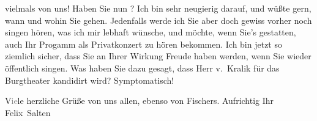 \begin{ledgroupsized}[t]{13cm}
               vielmals von uns! Haben Sie
               nun \label{K_L03560-5v}\label{K_L03560-5h}? Ich bin sehr neugierig darauf, und wüßte gern,
               wann und wohin Sie gehen. Jedenfalls werde ich Sie aber doch gewiss vorher noch
               singen hören, was ich mir lebhaft wünsche, und möchte, wenn Sie’s gestatten, auch Ihr
               Progamm als Privatkonzert zu hören bekommen. Ich bin jetzt so ziemlich sicher, dass
               Sie an Ihrer Wirkung Freude haben werden, wenn Sie wieder öffentlich singen.\pend
           \pstart
           Was haben Sie dazu gesagt, dass Herr v. Kralik
               für das Burgtheater kandidirt wird?
               Symptomatisch!\pend
           \pstart
           
               V\textcolor{gray}{ie}le herzliche Grüße von uns allen, ebenso von Fischers.\pend
           \pstart Aufrichtig Ihr \spacefill\mbox{Felix Salten}\pend{}
         
         \endnumbering{}\end{ledgroupsized}  \newcommand{\dateiname}{L03560}\newcommand{\titel}{Felix Salten an Olga Schnitzler, 2. 9. 1912}\newcommand{\editorInnen}{Martin Anton Müller und Laura Untner}
      